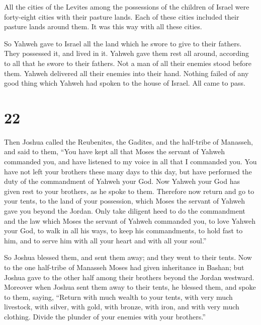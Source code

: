 All the cities of the Levites among the possessions of the
children of Israel were forty-eight cities with their pasture lands.
 Each of these cities included their pasture lands around
them. It was this way with all these cities.

 So Yahweh gave to Israel all the land which he swore to
give to their fathers. They possessed it, and lived in it. 
Yahweh gave them rest all around, according to all that he swore to
their fathers. Not a man of all their enemies stood before them. Yahweh
delivered all their enemies into their hand.  Nothing
failed of any good thing which Yahweh had spoken to the house of Israel.
All came to pass.

\hypertarget{section-21}{%
\section{22}\label{section-21}}

 Then Joshua called the Reubenites, the Gadites, and the
half-tribe of Manasseh,  and said to them, ``You have kept
all that Moses the servant of Yahweh commanded you, and have listened to
my voice in all that I commanded you.  You have not left
your brothers these many days to this day, but have performed the duty
of the commandment of Yahweh your God.  Now Yahweh your God
has given rest to your brothers, as he spoke to them. Therefore now
return and go to your tents, to the land of your possession, which Moses
the servant of Yahweh gave you beyond the Jordan.  Only take
diligent heed to do the commandment and the law which Moses the servant
of Yahweh commanded you, to love Yahweh your God, to walk in all his
ways, to keep his commandments, to hold fast to him, and to serve him
with all your heart and with all your soul.''

 So Joshua blessed them, and sent them away; and they went
to their tents.  Now to the one half-tribe of Manasseh Moses
had given inheritance in Bashan; but Joshua gave to the other half among
their brothers beyond the Jordan westward. Moreover when Joshua sent
them away to their tents, he blessed them,  and spoke to
them, saying, ``Return with much wealth to your tents, with very much
livestock, with silver, with gold, with bronze, with iron, and with very
much clothing. Divide the plunder of your enemies with your brothers.''

